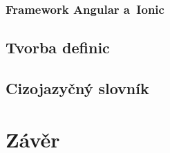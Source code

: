 \hypertarget{framework-angular-a-ionic}{%
\subsection{Framework Angular
a~Ionic}\label{framework-angular-a-ionic}}

\hypertarget{tvorba-definic}{%
\section{Tvorba definic}\label{tvorba-definic}}

\hypertarget{cizojazyux10dnuxfd-slovnuxedk}{%
\section{Cizojazyčný slovník}\label{cizojazyux10dnuxfd-slovnuxedk}}

\hypertarget{zuxe1vux11br}{%
\chapter*{Závěr}\label{zaver}
}
